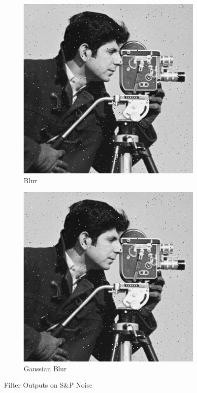 \documentclass{article}\raggedbottom
\begin{document}
\begin{figure}[H]
	\centering
	\begin{subfigure}[b]{0.45\linewidth}
		\includegraphics[width=\linewidth]{../../2_Software/data/blur_sp.png}
		\caption{Blur}
	\end{subfigure}
	\begin{subfigure}[b]{0.45\linewidth}
		\includegraphics[width=\linewidth]{../../2_Software/data/gblur_sp.png}
		\caption{Gaussian Blur}
	\end{subfigure}

	\caption{Filter Outputs on S\&P Noise}
	\label{fig:filter_outputs_3}
\end{figure}
\end{document}
